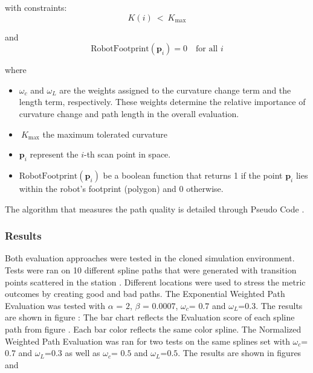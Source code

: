 \noindent
with constraints: \[K(i)\ <\ K_{\max}\]
\noindent

and \[\text{RobotFootprint}(\mathbf{p}_i) = 0 \quad \text{for all } i\]


where \begin{itemize}
    \item \(\omega_c\) and \(\omega_L\) are the weights assigned to the curvature change term and the length term, 
    respectively. These weights determine the relative importance of curvature change and path length in the overall 
    evaluation. 
    \item \(\ K_{\max}\) the maximum tolerated curvature
    \item \( \mathbf{p}_i \) represent the \( i \)-th scan point in space. 

    \item \( \text{RobotFootprint}(\mathbf{p}_i) \) be a boolean function that returns 1 if the point \( \mathbf{p}_i \) 
    lies within the robot's footprint (polygon) and 0 otherwise.
    
\end{itemize}

The algorithm that measures the path quality is detailed through Pseudo Code .

\subsubsection{Results}
Both evaluation approaches were tested in the cloned simulation environment. 
Tests were ran on 10 different spline paths  that were generated with transition points scattered in 
the station .
Different locations were used to stress the metric outcomes by creating good and bad paths. 
The Exponential Weighted Path Evaluation was tested with \(\alpha\) = \(2\), \(\beta\) = \(0.0007\), 
\(\omega_c\)= \(0.7\) and \(\omega_L\)=\(0.3\).
The results are shown in figure : The bar chart reflects the Evaluation score of each 
spline path from figure . Each bar color reflects the same color spline.
The Normalized Weighted Path Evaluation was ran for two tests on the same splines set with 
\(\omega_c\)= \(0.7\) and \(\omega_L\)=\(0.3\) as well as 
\(\omega_c\)= \(0.5\) and \(\omega_L\)=\(0.5\). 
The results are shown in figures  and 

